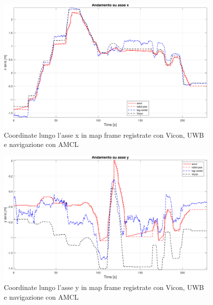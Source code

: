 \begin{figure}[] 
	\centering    
	\includegraphics[height=.3\textheight]{grafici_stanzavolo_vicon/figure5.pdf}
	\caption{Coordinate lungo l'asse x in map frame registrate con Vicon, UWB e navigazione con AMCL}
	\label{fig: asse_x_vicon_charlie}
\end{figure}

\begin{figure}[] 
	\centering    
	\includegraphics[height=.3\textheight]{grafici_stanzavolo_vicon/figure6.pdf}
	\caption{Coordinate lungo l'asse y in map frame registrate con Vicon, UWB e navigazione con AMCL}
	\label{fig: asse_y_vicon_charlie}
\end{figure}


